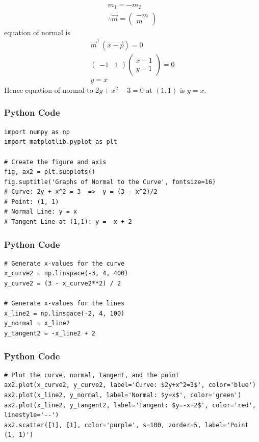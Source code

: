 \documentclass{beamer}
\begin{document}
\begin{frame}
\begin{align}
m_1=-m_2\\
\therefore \vec{m}=\begin{pmatrix} -m \\ m \end{pmatrix}
\end{align}
equation of normal is
\begin{align}
    \vec{m}^\top(\vec{x-p})=0\\
    \begin{pmatrix} -1&1\end{pmatrix}\begin{pmatrix}x-1\\y-1   \end{pmatrix}=0\\
        y=x
\end{align}
Hence equation of normal to $2y + x^2 - 3 = 0$ at $(1,1)$ is $y = x$.
\end{frame}


\begin{frame}[fragile]
\frametitle{Python Code}
\begin{lstlisting}
import numpy as np
import matplotlib.pyplot as plt

# Create the figure and axis
fig, ax2 = plt.subplots()
fig.suptitle('Graphs of Normal to the Curve', fontsize=16)
# Curve: 2y + x^2 = 3  =>  y = (3 - x^2)/2
# Point: (1, 1)
# Normal Line: y = x
# Tangent Line at (1,1): y = -x + 2
\end{lstlisting}
\end{frame}

\begin{frame}[fragile]
\frametitle{Python Code}
\begin{lstlisting}
# Generate x-values for the curve
x_curve2 = np.linspace(-3, 4, 400)
y_curve2 = (3 - x_curve2**2) / 2

# Generate x-values for the lines
x_line2 = np.linspace(-2, 4, 100)
y_normal = x_line2
y_tangent2 = -x_line2 + 2
\end{lstlisting}
\end{frame}

\begin{frame}[fragile]
\frametitle{Python Code}
\begin{lstlisting}
# Plot the curve, normal, tangent, and the point
ax2.plot(x_curve2, y_curve2, label='Curve: $2y+x^2=3$', color='blue')
ax2.plot(x_line2, y_normal, label='Normal: $y=x$', color='green')
ax2.plot(x_line2, y_tangent2, label='Tangent: $y=-x+2$', color='red', linestyle='--')
ax2.scatter([1], [1], color='purple', s=100, zorder=5, label='Point (1, 1)')
\end{lstlisting}
\end{frame}
\end{document}
